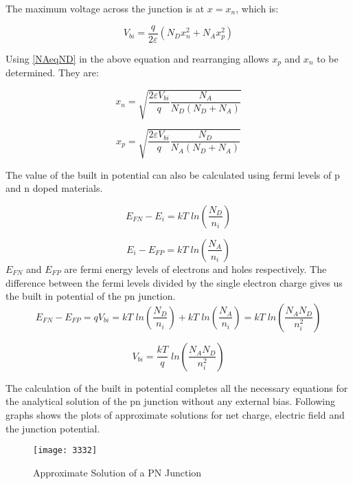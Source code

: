 The maximum voltage across the junction is at  $x= x_{n}$, which is:

\begin{equation}
V_{bi}=\frac{q}{2\varepsilon}(N_{D}x_{n}^2+N_{A}x_{p}^2)
\end{equation}

Using \eqref{NAeqND} in the above equation and rearranging allows $x_{p}$ and $x_{n}$ to be determined. They are:

\begin{equation}
x_{n}=\sqrt{\frac{2\varepsilon V_{bi}}{q}\frac{N_{A}}{N_{D}(N_{D}+N_{A})}}
\end{equation}

\begin{equation}
x_{p}=\sqrt{\frac{2\varepsilon V_{bi}}{q}\frac{N_{D}}{N_{A}(N_{D}+N_{A})}}
\end{equation}

The value of the built in potential can also be calculated using fermi levels of p and n doped materials.

\begin{equation}
E_{FN}-E_{i}=kT \; ln(\frac{N_{D}}{n_i})
\end{equation}

\begin{equation}
E_{i}-E_{FP}=kT \; ln(\frac{N_{A}}{n_i})
\end{equation}
$E_{FN}$ and $E_{FP}$ are fermi energy levels of electrons and holes respectively. The difference between the fermi levels divided by the single electron charge gives us the built in potential of the pn junction.
\begin{equation}
E_{FN}-E_{FP}=q V_{bi}=kT \; ln(\frac{N_{D}}{n_i})+kT \; ln(\frac{N_{A}}{n_i})=kT \; ln(\frac{N_{A}N_{D}}{n_i^2})
\end{equation}

\begin{equation}
V_{bi}=\frac{kT}{q} \; ln(\frac{N_{A}N_{D}}{n_i^2})
\end{equation}

The calculation of the built in potential completes all the necessary equations for the analytical solution of the pn junction without any external bias. Following graphs shows the plots of approximate solutions for net charge, electric field and the junction potential.

\begin{figure}
\centering
\texttt{[image: 3332]}
\caption{Approximate Solution of a PN Junction} 
\end{figure}



